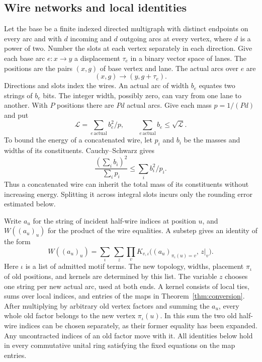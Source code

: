 \subsection{Wire networks and local identities}

Let the base be a finite indexed directed multigraph with distinct endpoints
on every arc and with $d$ incoming and $d$ outgoing arcs at every vertex,
where $d$ is a power of two. Number the slots at each vertex separately in
each direction. Give each base arc $e:x\to y$ a displacement $\tau_e$ in a
binary vector space of lanes. The positions are the pairs $(x,g)$ of base
vertex and lane. The actual arcs over $e$ are
\[
       (x,g)\longrightarrow (y,g+\tau_e).
\]
Directions and slots index the wires. An actual arc of width $b_e$ equates
two strings of $b_e$ bits. The integer width, possibly zero, can vary from one
lane to another. With $P$ positions there are $Pd$ actual arcs. Give each
mass $p=1/(Pd)$ and put
\[
   \mathcal L=\sum_{e\,\text{actual}} b_e^2/p,
   \qquad \sum_{e\,\text{actual}} b_e\le\sqrt{\mathcal L}.
\]
To bound the energy of a concatenated wire, let $p_i$ and $b_i$ be
the masses and widths of its constituents. Cauchy--Schwarz gives
\[
        \frac{(\sum_i b_i)^2}{\sum_i p_i}\le\sum_i b_i^2/p_i.
\]
Thus a concatenated wire can inherit the total mass of its constituents
without increasing energy. Splitting it across integral slots incurs only
the rounding error estimated below.

Write $a_u$ for the string of incident half-wire indices at position $u$,
and $W((a_u)_u)$ for the product of the wire equalities. A substep gives an
identity of the form
\begin{equation}\label{eq:kernel}
 W((a_u)_u)=\sum_{\iota}\ \sum_{z}
   \prod_{v} K_{v,\iota}
       \big((a_u)_{\pi_\iota(u)=v},\,z|_v\big).
\end{equation}
Here $\iota$ is a list of admitted motif terms. The new topology, widths,
placement $\pi_\iota$ of old positions, and kernels are determined by this
list. The variable $z$ chooses one string per new actual arc, used at both
ends. A kernel consists of local ties, sums over local indices, and entries
of the maps in Theorem~\ref{thm:conversion}. After multiplying by arbitrary old
vertex factors and summing the $a_u$, every whole old factor belongs to the new
vertex $\pi_\iota(u)$. In this sum the two old half-wire indices can be
chosen separately, as their former equality has been expanded. Any uncontracted
indices of an old factor move with it. All identities below hold in every
commutative unital ring satisfying the fixed equations on the map entries.

